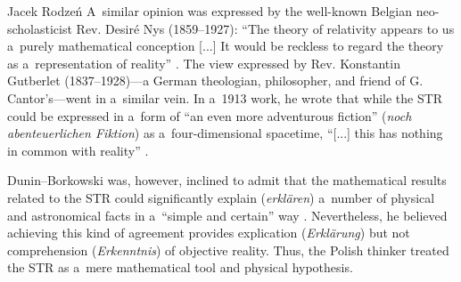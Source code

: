 \begin{artengenv}{Jacek Rodzeń}
A~similar opinion was expressed by the well-known Belgian neo-scholasticist Rev. Desiré Nys (1859–1927): ``The theory of relativity appears to us a~purely mathematical conception [...] It would be reckless to regard the theory as a~representation of reality''
\parencite*[][p.321]{nys_notion_1922}. %
 The view expressed by Rev. Konstantin Gutberlet (1837–1928)---a German theologian, philosopher, and friend of G. Cantor's---went in a~similar vein. In a~1913 work, he wrote that while the STR could be expressed in a~form of ``an even more adventurous fiction'' (\textit{noch abenteuerlichen Fiktion}) as a~four-dimensional spacetime, ``[...] this has nothing in common with reality'' 
\parencite*[][p.334]{gutberlet_streit_1913}.%


Dunin–Borkowski was, however, inclined to admit that the mathematical results related to the STR could significantly explain (\textit{erklären}) a~number of physical and astronomical facts in a~``simple and certain'' way
\parencite*[][p.212]{dunin-borkowski_neue_1921}. %
 Nevertheless, he believed achieving this kind of agreement provides explication (\textit{Erklärung}) but not comprehension (\textit{Erkenntnis}) of objective reality. Thus, the Polish thinker treated the STR as a~mere mathematical tool and physical hypothesis.


\end{artengenv}
